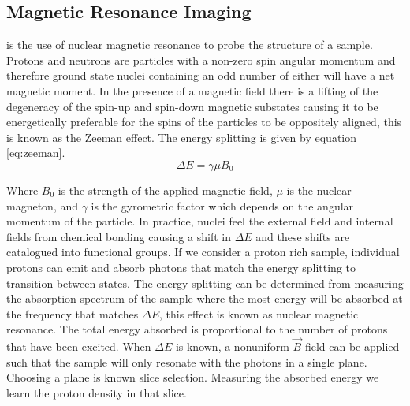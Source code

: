 


\subsection{Magnetic Resonance Imaging}
\mri is the use of nuclear magnetic resonance to probe the structure of a sample. Protons and neutrons are particles with a non-zero spin angular momentum and therefore ground state nuclei containing an odd number of either will have a net magnetic moment. In the presence of a magnetic field there is a lifting of the degeneracy of the spin-up and spin-down magnetic substates causing it to be energetically preferable for the spins of the particles to be oppositely aligned, this is known as the Zeeman effect. The energy splitting is given by equation \ref{eq:zeeman}.
\begin{equation}
    \Delta E = \gamma \mu B_0
    \label{eq:zeeman}
\end{equation}

Where $B_0$ is the strength of the applied magnetic field, $\mu$ is the nuclear magneton, and $\gamma$ is the gyrometric factor which depends on the angular momentum of the particle. \cite{griffiths2005introduction} In practice, nuclei feel the external field and internal fields from chemical bonding causing a shift in $\Delta E$ and these shifts are catalogued into functional groups. If we consider a proton rich sample, individual protons can emit and absorb photons that match the energy splitting to transition between states. The energy splitting can be determined from measuring the absorption spectrum of the sample where the most energy will be absorbed at the frequency that matches $\Delta E$, this effect is known as nuclear magnetic resonance. \cite{bushberg2011essential} The total energy absorbed is proportional to the number of protons that have been excited. When $\Delta E$ is known, a nonuniform $\vec{B}$ field can be applied such that the sample will only resonate with the photons in a single plane. Choosing a plane is known slice selection. Measuring the absorbed energy we learn the proton density in that slice.

